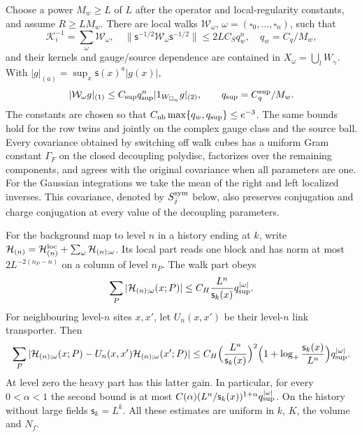 \documentclass[11pt,letterpaper,reqno]{amsart}
\makeatletter
\theoremstyle{definition}
\newcommand{\ms@minorstart}{%
  \pushQED{\qed}\renewcommand{\qedsymbol}{$\blacksquare$}}
\newenvironment{proposition}[1][]{\ms@minorstart\ms@proposition[#1]}
  {\popQED\endms@proposition}
\theoremstyle{remark}
\makeatother
\begin{document}
\begin{proposition}[Local walks and background maps]\label{C-397-40}
Choose a power $M_w\ge L$ of $L$ after the operator and local-regularity
constants, and assume $R\ge LM_w$.  There are local walks
$\mathcal W_\omega$, $\omega=(\square_0,\ldots,\square_n)$,
such that
\[
 \mathcal K_i^{-1}=\sum_\omega\mathcal W_\omega,
 \quad
 \|\mathsf s^{-1/2}\mathcal W_\omega\mathsf s^{-1/2}\|
       \le2LC_Sq_w^n,
 \quad q_w=C_q/M_w,
\]
and their kernels and gauge/source dependence are contained in
$X_\omega=\bigcup_lW_{\square_l}$.  With
$|g|_{(a)}=\sup_x\mathsf s(x)^a|g(x)|$,
\[
 |\mathcal W_\omega g|_{(1)}
       \le C_{\rm sup}q_{\rm sup}^n
                         |1_{W_{\square_n}}g|_{(2)},
 \qquad q_{\rm sup}=C_q^{\rm sup}/M_w.
\]
The constants are chosen so that
$C_{\rm nb}\max\{q_w,q_{\rm sup}\}\le e^{-3}$.
The same bounds hold for the row twins and jointly on the complex
gauge class and the source ball.  Every covariance obtained by
switching off walk cubes has a uniform Gram constant $\Gamma_F$
on the closed decoupling polydisc, factorizes over the remaining
components, and agrees with the original covariance when all
parameters are one.
For the Gaussian integrations we take the mean of the right and left
localized inverses.  This covariance, denoted by $S_j^{\rm sym}$ below,
also preserves conjugation and charge conjugation at every value of
the decoupling parameters.

For the background map to level $n$ in a history ending at $k$,
write $\mathcal H_{(n)}=\mathcal H^{\rm loc}_{(n)}+
\sum_\omega\mathcal H_{(n);\omega}$.  Its local part reads one
block and has norm at most $2L^{-2(n_P-n)}$ on a column of level
$n_P$.  The walk part obeys
\[
 \sum_P|\mathcal H_{(n);\omega}(x;P)|
       \le C_H\frac{L^n}{\mathsf s_k(x)}q_{\rm sup}^{|\omega|}.
\]
For neighbouring level-$n$ sites $x,x'$, let $U_n(x,x')$
be their level-$n$ link transporter. Then
\[
 \sum_P|\mathcal H_{(n);\omega}(x;P)-
       U_n(x,x')\mathcal H_{(n);\omega}(x';P)|
 \le C_H\Bigl(\frac{L^n}{\mathsf s_k(x)}\Bigr)^2
 \Bigl(1+\log_+\frac{\mathsf s_k(x)}{L^n}\Bigr)
 q_{\rm sup}^{|\omega|}.
\]
At level zero the heavy part has this latter gain.  In particular,
for every $0<\alpha<1$ the second bound is at most
$C(\alpha)(L^n/\mathsf s_k(x))^{1+\alpha}q_{\rm sup}^{|\omega|}$.
On the history without large fields $\mathsf s_k=L^k$.
All these estimates are uniform in $k$, $K$, the volume and $N_f$.
\end{proposition}
\end{document}
